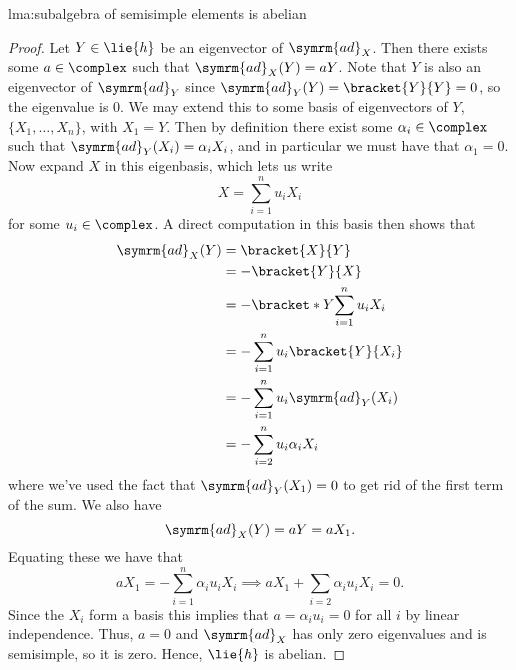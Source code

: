 \documentclass[fleqn]{NotesClass}
\newcommand{\ad}{\symrm{ad}}
\begin{document}
\begin{lma}{}{lma:subalgebra of semisimple elements is abelian}
\begin{proof}
            Let \(Y \in \lie{h}\) be an eigenvector of \(\ad_X\).
            Then there exists some \(a \in \complex\) such that \(\ad_X(Y) = aY\).
            Note that \(Y\) is also an eigenvector of \(\ad_Y\) since \(\ad_Y(Y)= \bracket{Y}{Y} = 0\), so the eigenvalue is \(0\).
            We may extend this to some basis of eigenvectors of \(Y\), \(\{X_1, \dotsc, X_n\}\), with \(X_1 = Y\).
            Then by definition there exist some \(\alpha_i \in \complex\) such that \(\ad_Y(X_i) = \alpha_iX_i\), and in particular we must have that \(\alpha_1 = 0\).
            Now expand \(X\) in this eigenbasis, which lets us write
            \begin{equation}
                X = \sum_{i=1}^n u_iX_i
            \end{equation}
            for some \(u_i \in \complex\).
            A direct computation in this basis then shows that
            \begin{align}
                \ad_X(Y) &= \bracket{X}{Y}\\
                &= -\bracket{Y}{X}\\
                &= -\bracket*{Y}{\sum_{i=1}^n u_i X_i}\\
                &= -\sum_{i=1}^n u_i \bracket{Y}{X_i}\\
                &= -\sum_{i=1}^n u_i \ad_Y(X_i)\\
                &= -\sum_{i=2}^n u_i \alpha_iX_i
            \end{align}
            where we've used the fact that \(\ad_Y(X_1) = 0\) to get rid of the first term of the sum.
            We also have
            \begin{equation}
                \ad_X(Y) = aY = aX_1.
            \end{equation}
            Equating these we have that
            \begin{equation}
                aX_1 = -\sum_{i=1}^n \alpha_i u_i X_i \implies aX_1 + \sum_{i=2} \alpha_i u_i X_i = 0.
            \end{equation}
            Since the \(X_i\) form a basis this implies that \(a = \alpha_i u_i = 0\) for all \(i\) by linear independence.
            Thus, \(a = 0\) and \(\ad_X\) has only zero eigenvalues and is semisimple, so it is zero.
            Hence, \(\lie{h}\) is abelian.
        \end{proof}
    \end{lma}
    
\end{document}
